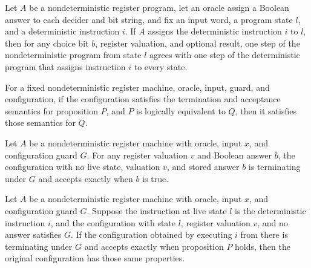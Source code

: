 \begin{lemma}
\label{Complexity.LogProg.nastep_det'}
\leanok
{}
Let $A$ be a nondeterministic register program, let an oracle assign a Boolean answer to
each decider and bit string, and fix an input word, a program state $l$, and a
deterministic instruction $i$. If $A$ assigns the deterministic instruction $i$ to $l$,
then for any choice bit $b$, register valuation, and optional result, one step of the
nondeterministic program from state $l$ agrees with one step of the deterministic
program that assigns instruction $i$ to every state.
\end{lemma}

\begin{lemma}
\label{Complexity.LogProg.NSem.congr}
\leanok
{}
For a fixed nondeterministic register machine, oracle, input, guard, and configuration,
if the configuration satisfies the termination and acceptance semantics for proposition
$P$, and $P$ is logically equivalent to $Q$, then it satisfies those semantics for $Q$.
\end{lemma}

\begin{lemma}
\label{Complexity.LogProg.NSem.halted}
\leanok
{}
Let $A$ be a nondeterministic register machine with oracle, input $x$, and configuration
guard $G$. For any register valuation $v$ and Boolean answer $b$, the configuration with
no live state, valuation $v$, and stored answer $b$ is terminating under $G$ and accepts
exactly when $b$ is true.
\end{lemma}

\begin{lemma}
\label{Complexity.LogProg.NSem.det}
\leanok
{}
Let $A$ be a nondeterministic register machine with oracle, input $x$, and configuration
guard $G$. Suppose the instruction at live state $l$ is the deterministic instruction
$i$, and the configuration with state $l$, register valuation $v$, and no answer
satisfies $G$. If the configuration obtained by executing $i$ from there is terminating
under $G$ and accepts exactly when proposition $P$ holds, then the original
configuration has those same properties.
\end{lemma}

